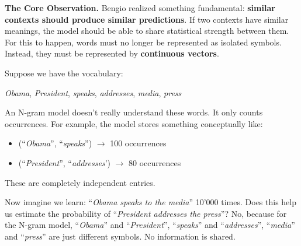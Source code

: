 \highspace
\textcolor{Green3}{ \textbf{The Core Observation.}} Bengio realized something fundamental: \textbf{similar contexts should produce similar predictions}. If two contexts have similar meanings, the model should be able to share statistical strength between them. For this to happen, words must no longer be represented as isolated symbols. Instead, they must be represented by \textbf{continuous vectors}.

\highspace
\begin{remarkbox}
    Suppose we have the vocabulary:
    \begin{center}
        \emph{Obama}, \emph{President}, \emph{speaks}, \emph{addresses}, \emph{media}, \emph{press}
    \end{center}
    An N-gram model doesn't really understand these words. It only counts occurrences. For example, the model stores something conceptually like:
    \begin{itemize}
        \item (``\emph{Obama}'', ``\emph{speaks}'') $\to$ 100 occurrences
        \item (``\emph{President}'', ``\emph{addresses}') $\to$ 80 occurrences
    \end{itemize}
    These are completely independent entries.

    \highspace
    Now imagine we learn: ``\emph{Obama speaks to the media}'' 10'000 times. Does this help us estimate the probability of ``\emph{President addresses the press}''? No, because for the N-gram model, ``\emph{Obama}'' and ``\emph{President}'', ``\emph{speaks}'' and ``\emph{addresses}'', ``\emph{media}'' and ``\emph{press}'' are just different symbols. No information is shared.


\end{remarkbox}
